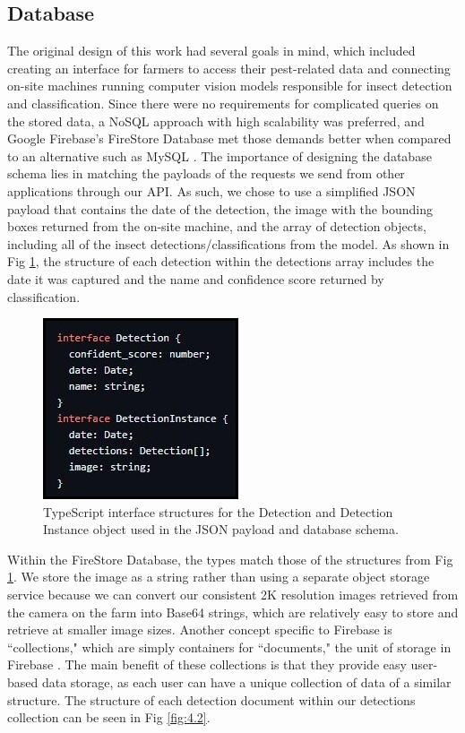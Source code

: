 \subsection{Database}

The original design of this work had several goals in mind, which included creating an interface for farmers to access their pest-related data and connecting on-site machines running computer vision models responsible for insect detection and classification. Since there were no requirements for complicated queries on the stored data, a NoSQL approach with high scalability was preferred, and Google Firebase's FireStore Database met those demands better when compared to an alternative such as MySQL \cite{clark_2022}. The importance of designing the database schema lies in matching the payloads of the requests we send from other applications through our API. As such, we chose to use a simplified JSON payload that contains the date of the detection, the image with the bounding boxes returned from the on-site machine, and the array of detection objects, including all of the insect detections/classifications from the model. As shown in Fig \ref{fig:4.1}, the structure of each detection within the detections array includes the date it was captured and the name and confidence score returned by classification.

\begin{figure}[H]
\begin{center}
\includegraphics{Honors_Thesis/Figures/4.1.jpg}
\end{center}
\caption{TypeScript interface structures for the Detection and Detection Instance object used in the JSON payload and database schema.}
\label{fig:4.1}
\end{figure}

Within the FireStore Database, the types match those of the structures from Fig \ref{fig:4.1}. We store the image as a string rather than using a separate object storage service because we can convert our consistent 2K resolution images retrieved from the camera on the farm into Base64 strings, which are relatively easy to store and retrieve at smaller image sizes. Another concept specific to Firebase is ``collections," which are simply containers for ``documents," the unit of storage in Firebase \cite{google}. The main benefit of these collections is that they provide easy user-based data storage, as each user can have a unique collection of data of a similar structure. The structure of each detection document within our detections collection can be seen in Fig \ref{fig:4.2}.


